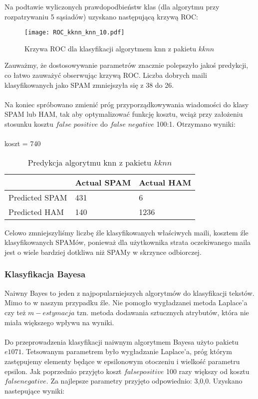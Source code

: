 \documentclass[fleqn]{article}
\begin{document}
\noindent Na podtawie wyliczonych prawdopodbieństw klas (dla algorytmu przy rozpatrywaniu 5 sąsiadów) uzyskano następującą krzywą ROC:

\begin{figure}[H]
\centering
\texttt{[image: ROC\_kknn\_knn\_10.pdf]}
\caption{Krzywa ROC dla klasyfikacji algorytmem knn z pakietu $kknn$ \label{overflow}}
\label{fig:picture}
\end{figure}

\noindent Zauważmy, że dostosowywanie parametrów znacznie polepszyło jakoś predykcji, co łatwo zauważyć obserwując krzywą ROC. Liczba dobrych maili klasyfikowanych jako SPAM zmniejszyła się z 38 do 26.
\\ \\
Na koniec spróbowano zmienić próg przyporządkowywania wiadomości do klasy SPAM lub HAM, tak aby optymalizować funkcję kosztu, wciąż przy założeniu stosunku kosztu $false$ $positive$ do $false$ $negative$ 100:1. Otrzymano wyniki:
\\ \\
koszt = 740

\begin{table}[h!]
  \centering
  \label{tab:table1}
  \begin{tabular}{l||l|l}
     & Actual SPAM & Actual HAM\\
    \hline
    Predicted SPAM & 431 & 6\\
    Predicted HAM & 140 & 1236\\
  \end{tabular}
  \caption{Predykcja algorytmu knn z pakietu $kknn$}
\end{table}

Celowo zmniejszyliśmy liczbę źle klasyfikowanych właściwych maili, kosztem źle klasyfikowanych SPAMów, ponieważ dla użytkownika strata oczekiwanego maila jest o wiele bardziej dotkliwa niż SPAMy w skrzynce odbiorczej.

\subsubsection{Klasyfikacja Bayesa}
Naiwny Bayes to jeden z najpopularniejszych algorytmów do klasyfikacji tekstów. Mimo to w naszym przypadku źle. Nie pomogło wygładzanei metoda Laplace'a czy też $m-estymacja$ tzn. metoda dodawania sztucznych atrybutów, która nie miała większego wpływu na wyniki.
\\ \\
Do przeprowadzenia klasyfikacji naiwnym algorytmem Bayesa użyto pakietu $e1071$. Tetsowanym parametrem było wygładzanie Laplace'a, próg którym zastępujemy elementy będące w epsilonowym otoczeniu i wielkość parametru epsilon. Jak poprzednio przyjęto koszt $false positive$ 100 razy większy od kosztu $false negative$. Za najlepsze parametry przyjęto odpowiednio: 3,0,0. Uzyskano nastepujące wyniki:
\end{document}
